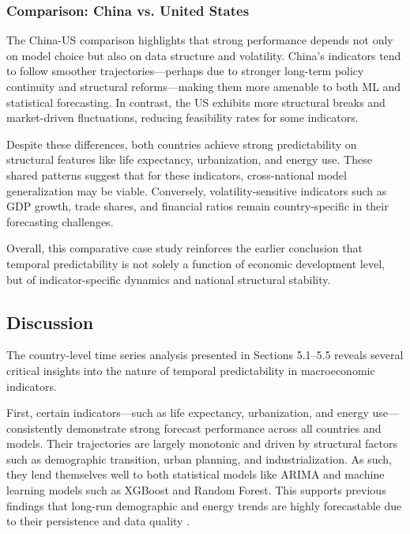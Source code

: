 \documentclass[12pt]{article}
\begin{document}
\subsubsection*{Comparison: China vs. United States}

The China-US comparison highlights that strong performance depends not only on model choice but also on data structure and volatility. China's indicators tend to follow smoother trajectories—perhaps due to stronger long-term policy continuity and structural reforms—making them more amenable to both ML and statistical forecasting. In contrast, the US exhibits more structural breaks and market-driven fluctuations, reducing feasibility rates for some indicators.\cite{stock2002structural, koop2013us}

Despite these differences, both countries achieve strong predictability on structural features like life expectancy, urbanization, and energy use. These shared patterns suggest that for these indicators, cross-national model generalization may be viable. Conversely, volatility-sensitive indicators such as GDP growth, trade shares, and financial ratios remain country-specific in their forecasting challenges.

Overall, this comparative case study reinforces the earlier conclusion that temporal predictability is not solely a function of economic development level, but of indicator-specific dynamics and national structural stability.\cite{lin2012newstructural, reifschneider2015usforecasting}
\subsection{Discussion}

The country-level time series analysis presented in Sections 5.1–5.5 reveals several critical insights into the nature of temporal predictability in macroeconomic indicators.

First, certain indicators—such as life expectancy, urbanization, and energy use—consistently demonstrate strong forecast performance across all countries and models. Their trajectories are largely monotonic and driven by structural factors such as demographic transition, urban planning, and industrialization. As such, they lend themselves well to both statistical models like ARIMA and machine learning models such as XGBoost and Random Forest. This supports previous findings that long-run demographic and energy trends are highly forecastable due to their persistence and data quality \cite{Bloom2008, xie2018macroeconomic}.
\end{document}

